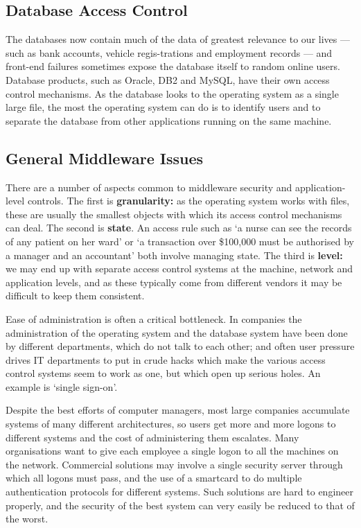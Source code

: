 		\subsection{Database Access Control}
			The databases now contain much of the data of greatest relevance to our lives 
			— such as bank accounts, vehicle regis-trations and employment records — 
			and front-end failures sometimes expose the database itself to random online users.
			Database products, such as Oracle, DB2 and MySQL, have their own access
			control mechanisms. As the database looks to the operating system as a single
			large file, the most the operating system can do is to identify users and to
			separate the database from other applications running on the same machine.

		\subsection{General Middleware Issues}
			There are a number of aspects common to middleware security and application-
			level controls. The first is {\bf granularity:} as the operating system works 
			with files, these are usually the smallest objects with which its access control mechanisms can deal. The second is {\bf state}. An access rule such as ‘a nurse can 
			see the records of any patient on her ward’ or ‘a transaction over \$100,000 
			must be authorised by a manager and an accountant’ both involve managing state.
			The third is {\bf level:} we may end up with separate access control systems at 
			the machine, network and application levels, and as these typically come from 
			different vendors it may be difficult to keep them consistent.


			Ease of administration is often a critical bottleneck. In companies the 
			administration of the operating system and the database system
			have been done by different departments, which do not talk to each other;
			and often user pressure drives IT departments to put in crude hacks which
			make the various access control systems seem to work as one, but which open
			up serious holes. An example is ‘single sign-on’. 

			Despite the best efforts of computer managers, most large companies accumulate 
			systems of many different architectures, so users get more and more logons to 
			different systems and the cost of administering them escalates. 
			Many organisations want to give
			each employee a single logon to all the machines on the network. 
			Commercial solutions may involve a single security server through which all 
			logons must pass, and the use of a smartcard to do multiple authentication 
			protocols for different systems. Such solutions are hard to engineer properly, 
			and the security of the best system can very easily be reduced to that of the worst.


